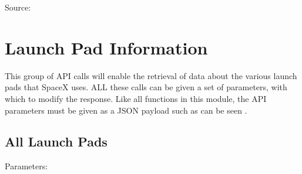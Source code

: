 \documentclass[letterpaper,10pt,english]{sphinxmanual}
\begin{document}

\noindent{}

Source:  


\chapter{Launch Pad Information}
\label{\detokenize{details/launchpads:launch-pad-information}}\label{\detokenize{details/launchpads::doc}}
This group of API calls will enable the retrieval of data about the various launch pads that SpaceX uses.
ALL these calls can be given a set of parameters, with which to modify the response.
Like all functions in this module, the API parameters must be given as a JSON payload such as can be seen .


\section{All Launch Pads}
\label{\detokenize{details/launchpads:all-launch-pads}}
\begin{sphinxVerbatim}[commandchars=\\\{\}]
  
\end{sphinxVerbatim}

Parameters:
\end{document}
